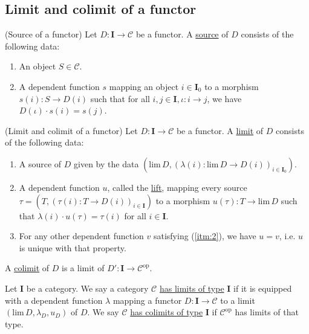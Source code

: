 
\subsection{Limit and colimit of a functor}

\begin{definition}{(Source of a functor)}
Let $D : \mathbf{I} \rightarrow \mathcal{C}$ be a functor. A \ul{source} of $D$ consists of the following data:
\begin{enumerate}
\renewcommand{\labelenumi}{(\theenumi)}
\item An object $S \in \mathcal{C}$.
\item A dependent function $s$ mapping an object $i \in \mathbf{I}_{0}$ to a morphism
$s(i) : S \rightarrow D(i)$ such that for all $i, j \in \mathbf{I}, \iota : i \rightarrow j$, we have $D(\iota) \cdot s(i) = s(j)$.
\end{enumerate}
\end{definition}

\begin{definition}{(Limit and colimit of a functor)}\label{def:limit}
Let $D : \mathbf{I} \rightarrow \mathcal{C}$ be a functor. A \ul{limit} of $D$ consists of the
following data:
\begin{enumerate}
\renewcommand{\labelenumi}{(\theenumi)}
\item A source of $D$ given by the data $(\mathrm{lim}\, D, (\lambda(i) : \mathrm{lim}\, D \rightarrow D(i))_{i\in\mathbf{I}_{0}})$.
\item A dependent function $u$, called the \ul{lift}, mapping every source $\tau = (T, (\tau(i) : T \rightarrow D(i))_{i \in \mathbf{I}})$ to a
morphism $u(\tau) : T \rightarrow \mathrm{lim}\, D$ such that $\lambda(i) \cdot u(\tau) = \tau(i)$ for all $i \in \mathbf{I}$.\label{itm:2}
\item For any other dependent function $v$ satisfying (\ref{itm:2}), we have $u = v$, i.e. $u$ is unique with that property.
\end{enumerate}
A \ul{colimit} of $D$ is a limit of $D' : \mathbf{I} \rightarrow \mathcal{C}^{\mathrm{op}}$.
\end{definition}

\begin{definition}
Let $\mathbf{I}$ be a category. We say a category $\mathcal{C}$ \ul{has limits of type} $\mathbf{I}$ if it is
equipped with a dependent function $\lambda$ mapping a functor $D : \mathbf{I} \rightarrow \mathcal{C}$ to a limit
$(\mathrm{lim}\, D, \lambda_{D}, u_{D})$ of $D$.
We say $\mathcal{C}$ \ul{has colimits of type} $\mathbf{I}$ if $\mathcal{C}^{\mathrm{op}}$ has limits of that type.
\end{definition}


